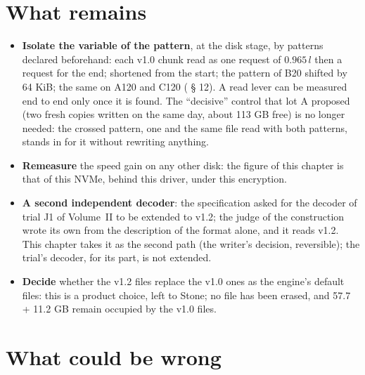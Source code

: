 \section{What remains}\label{t3cod:sec:reste}

\begin{itemize}
\item \textbf{Isolate the variable of the pattern}, at the disk stage, by patterns declared beforehand: each v1.0 chunk read as one request of $0.965\,l$ then a request for the end; shortened from the start; the pattern of B20 shifted by 64 KiB; the same on A120 and C120 ( § 12). A read lever can be measured end to end only once it is found. The ``decisive'' control that lot A proposed (two fresh copies written on the same day, about 113 GB free) is no longer needed: the crossed pattern, one and the same file read with both patterns, stands in for it without rewriting anything.
\item \textbf{Remeasure} the speed gain on any other disk: the figure of this chapter is that of this NVMe, behind this driver, under this encryption.
\item \textbf{A second independent decoder}: the specification asked for the decoder of trial J1 of Volume~II to be extended to v1.2; the judge of the construction wrote its own from the description of the format alone, and it reads v1.2. This chapter takes it as the second path (the writer's decision, reversible); the trial's decoder, for its part, is not extended.
\item \textbf{Decide} whether the v1.2 files replace the v1.0 ones as the engine's default files: this is a product choice, left to Stone; no file has been erased, and 57.7 + 11.2 GB remain occupied by the v1.0 files.
\end{itemize}

\section{What could be wrong}\label{t3cod:sec:faux}

